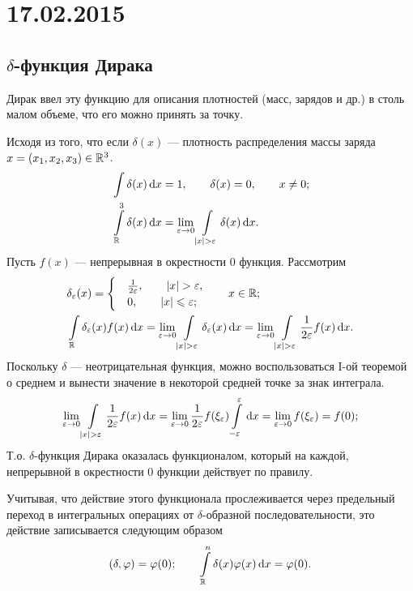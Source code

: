 \section{17.02.2015}
\subsection{$\delta$-функция Дирака}

Дирак ввел эту функцию для описания плотностей (масс, зарядов и др.) в столь малом объеме, что его можно принять за точку.

Исходя из того, что если $\delta(x)$ --- плотность распределения массы заряда $x = (x_1,x_2,x_3) \in \mathbb{R}^3$.
\begin{align*}
	&\int \delta(x) \dd x = 1, \qquad \delta(x) = 0, \qquad x \ne 0; \\
	&\integral{\fieldr^3}{\delta(x)}{x} = \lim_{\epsilon \to 0} \integral{{\abs{x}>\epsilon}}{\delta(x)}{x}.
\end{align*}
Пусть $f(x)$ --- непрерывная в окрестности 0 функция. Рассмотрим
\begin{align*}
	&\delta_{\epsilon}(x) = 
		\begin{cases}
			&\frac{1}{2\epsilon}, \qquad \abs{x} > \epsilon, \\
			&0, \qquad \abs{x} \leq \epsilon;
		\end{cases} \qquad x \in \fieldr; \\
	&\integral{\fieldr}{\delta_{\epsilon}(x)f(x)}{x} = \lim_{\epsilon \to 0} \integral{{\abs{x}>\epsilon}}{\delta_{\epsilon}(x)}{x} = \lim_{\epsilon \to 0} \integral{{\abs{x}>\epsilon}}{\frac{1}{2\epsilon}f(x)}{x}.
\end{align*}
Поскольку $\delta$ --- неотрицательная функция, можно воспользоваться I-ой теоремой о среднем и вынести значение в некоторой средней точке за знак интеграла.
$$
	\lim_{\epsilon \to 0} \integral{{\abs{x}>\epsilon}}{\frac{1}{2\epsilon}f(x)}{x} = \lim_{\epsilon \to 0} {\frac{1}{2\epsilon} f(\xi_{\epsilon}) \integral{{-\epsilon}^{\epsilon}}{}{x}} = \lim_{\epsilon \to 0} f(\xi_{\epsilon}) = f(0);
$$
Т.о. $\delta$-функция Дирака оказалась функционалом, который на каждой, непрерывной в окрестности 0 функции действует по правилу. 

Учитывая, что действие этого функционала прослеживается через предельный переход в интегральных операциях от $\delta$-образной последовательности, это действие записывается следующим образом
$$
	\left( \delta, \varphi \right) = \varphi(0); \qquad \int\limits_{\mathbb{R}}^n \delta(x)\varphi(x) \,\mathrm{d}{x} = \varphi(0).
$$

